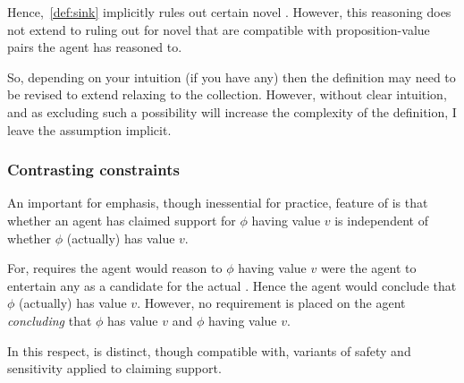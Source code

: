 \begin{note}
{    Hence,~\autoref{def:sink} implicitly rules out certain novel \epPAd{} .
    However, this reasoning does not extend to ruling out for novel  that are compatible with proposition-value pairs the agent has reasoned to.

    So, depending on your intuition (if you have any) then the definition may need to be revised to extend relaxing to the collection.
    However, without clear intuition, and as excluding such a possibility will increase the complexity of the definition, I leave the assumption implicit.
  }
\end{note}

\subsubsection{Contrasting constraints}
\label{sec:ideaS:contrast}

\begin{note}
  An important for emphasis, though inessential for practice, feature of \ideaS{} is that whether an agent has claimed support for \(\phi\) having value \(v\) is independent of whether \(\phi\) (actually) has value \(v\).

  For, \ideaS{} requires the agent would reason to \(\phi\) having value \(v\) were the agent to entertain any \epPAd{} \world{} as a candidate for the actual \world{}.
  Hence the agent would conclude that \(\phi\) (actually) has value \(v\).
  However, no requirement is placed on the agent \emph{concluding} that \(\phi\) has value \(v\) and \(\phi\) having value \(v\).

  In this respect, \ideaS{} is distinct, though compatible with, variants of safety and sensitivity applied to claiming support.
\end{note}


